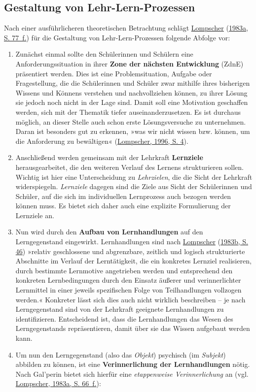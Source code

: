 \documentclass[
  ngerman,
]{scrbook}
\theoremstyle{definition}
\theoremstyle{definition}
\theoremstyle{definition}
\theoremstyle{definition}
\theoremstyle{remark}
\begin{document}
\hypertarget{gestaltung-von-lehr-lern-prozessen}{%
\subsection{Gestaltung von Lehr-Lern-Prozessen}\label{gestaltung-von-lehr-lern-prozessen}}

Nach einer ausführlicheren theoretischen Betrachtung schlägt \protect\hyperlink{ref-Lompscher1983a}{Lompscher} (\protect\hyperlink{ref-Lompscher1983a}{1983a, S. 77~f.}) für die Gestaltung von Lehr-Lern-Prozessen folgende Abfolge vor:

\begin{enumerate}
\def\labelenumi{\arabic{enumi}.}
\item
  Zunächst einmal sollte den Schülerinnen und Schülern eine Anforderungssituation in ihrer \textbf{Zone der nächsten Entwicklung} (ZdnE) präsentiert werden. Dies ist eine Problemsituation, Aufgabe oder Fragestellung, die die Schülerinnen und Schüler zwar mithilfe ihres bisherigen Wissens und Könnens verstehen und nachvollziehen können, zu ihrer Lösung sie jedoch noch nicht in der Lage sind. Damit soll eine Motivation geschaffen werden, sich mit der Thematik tiefer auseinanderzusetzen. Es ist durchaus möglich, an dieser Stelle auch schon erste Lösungsversuche zu unternehmen. Daran ist besonders gut zu erkennen, »was wir nicht wissen bzw. können, um die Anforderung zu bewältigen« (\protect\hyperlink{ref-Lompscher1996}{Lompscher, 1996, S. 4}).
\item
  Anschließend werden gemeinsam mit der Lehrkraft \textbf{Lernziele} herausgearbeitet, die den weiteren Verlauf des Lernens strukturieren sollen. Wichtig ist hier eine Unterscheidung zu \emph{Lehrzielen}, die die Sicht der Lehrkraft widerspiegeln. \emph{Lernziele} dagegen sind die Ziele aus Sicht der Schülerinnen und Schüler, auf die sich im individuellen Lernprozess auch bezogen werden können muss. Es bietet sich daher auch eine explizite Formulierung der Lernziele an.
\item
  Nun wird durch den \textbf{Aufbau von Lernhandlungen} auf den Lerngegenstand eingewirkt. Lernhandlungen sind nach \protect\hyperlink{ref-Lompscher1983}{Lompscher} (\protect\hyperlink{ref-Lompscher1983}{1983b, S. 46}) »relativ geschlossene und abgrenzbare, zeitlich und logisch strukturierte Abschnitte im Verlauf der Lerntätigkeit, die ein konkretes Lernziel realisieren, durch bestimmte Lernmotive angetrieben werden und entsprechend den konkreten Lernbedingungen durch den Einsatz äußerer und verinnerlichter Lernmittel in einer jeweils spezifischen Folge von Teilhandlungen vollzogen werden.« Konkreter lässt sich dies auch nicht wirklich beschreiben -- je nach Lerngegenstand sind von der Lehrkraft geeignete Lernhandlungen zu identifizieren. Entscheidend ist, dass die Lernhandlungen das Wesen des Lerngegenstands repräsentieren, damit über sie das Wissen aufgebaut werden kann.
\item
  Um nun den Lerngegenstand (also das \emph{Objekt}) psychisch (im \emph{Subjekt}) abbilden zu können, ist eine \textbf{Verinnerlichung der Lernhandlungen} nötig. Nach Gal'perin bietet sich hierfür eine \emph{etappenweise Verinnerlichung} an (vgl. \protect\hyperlink{ref-Lompscher1983a}{Lompscher, 1983a, S. 66~f.}):


\end{enumerate}
\end{document}
